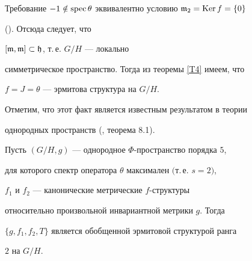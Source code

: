 \begin{pf}


Требование  $-1\notin


\spec\theta$ эквивалентно условию $\frak{m}_2=\Ker f=\{0\}$ 


(\cite{13}). Отсюда следует, что


$[\frak{m},\frak{m}]\subset\frak{h}$, т.\,е. $G/H$ --- локально


симметрическое пространство. Тогда из теоремы \ref{T4} имеем, что


$f=J=\theta$ --- эрмитова структура на $G/H$.


\end{pf}





Отметим, что этот факт является известным результатом в теории


однородных пространств (\cite{6}, теорема 8.1).





\begin{thm}\label{T5}


Пусть $(G/H, g)$ --- однородное $\Phi$-пространство порядка $5$,


для которого спектр оператора $\theta$ максимален $($т.\,е. $s=2)$,


$f_1$ и $f_2$ --- канонические метрические $f$-структуры


относительно произвольной инвариантной метрики $g$. Тогда


$\{g,f_1,f_2,T\}$ является обобщенной эрмитовой структурой ранга


$2$ на $G/H$.


\end{thm}





